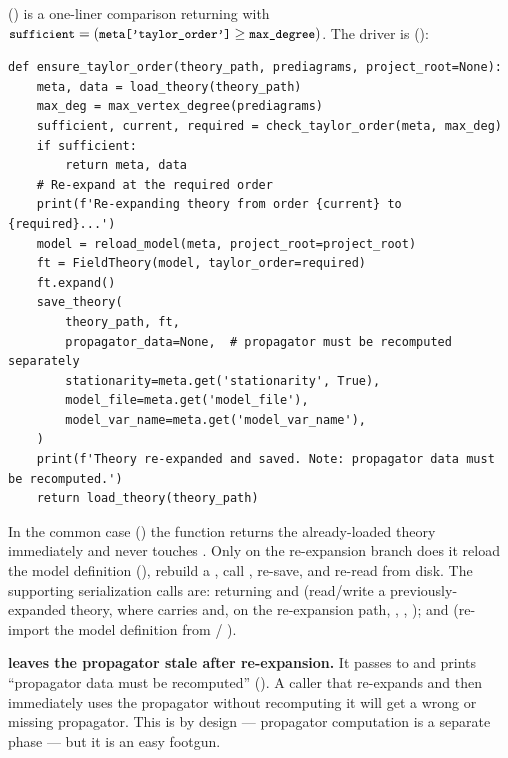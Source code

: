  () is a
one-liner comparison returning  with $\texttt{\small sufficient} = (\texttt{\small meta['taylor\_order']} \ge
\texttt{\small max\_degree})$. The driver is  ():

\begin{lstlisting}
def ensure_taylor_order(theory_path, prediagrams, project_root=None):
    meta, data = load_theory(theory_path)
    max_deg = max_vertex_degree(prediagrams)
    sufficient, current, required = check_taylor_order(meta, max_deg)
    if sufficient:
        return meta, data
    # Re-expand at the required order
    print(f'Re-expanding theory from order {current} to {required}...')
    model = reload_model(meta, project_root=project_root)
    ft = FieldTheory(model, taylor_order=required)
    ft.expand()
    save_theory(
        theory_path, ft,
        propagator_data=None,  # propagator must be recomputed separately
        stationarity=meta.get('stationarity', True),
        model_file=meta.get('model_file'),
        model_var_name=meta.get('model_var_name'),
    )
    print(f'Theory re-expanded and saved. Note: propagator data must be recomputed.')
    return load_theory(theory_path)
\end{lstlisting}

In the common case () the function returns the
already-loaded theory immediately and never touches . Only on
the re-expansion branch does it reload the model definition
(), rebuild a , call , re-save, and re-read from disk.
The supporting serialization calls are:  returning
 and  (read/write a
previously-expanded theory, where  carries 
and, on the re-expansion path, ,
, ); and
 (re-import the model definition from
 / ).

\begin{gotcha}
\label{gotcha:stale-prop}
\textbf{ leaves the propagator stale after
re-expansion.} It passes  to  and
prints ``propagator data must be recomputed''
(). A caller that re-expands and then immediately
uses the propagator without recomputing it will get a wrong or missing
propagator. This is by design --- propagator computation is a separate phase ---
but it is an easy footgun.
\end{gotcha}

